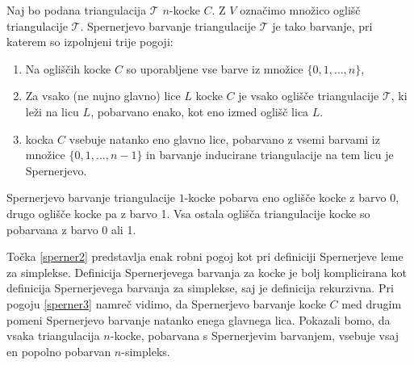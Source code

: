 \documentclass[mat1]{fmfdelo}
\newcommand{\0}{0}
\newcommand{\pT}{\mathcal T}
\begin{document}
\begin{definicija}\label{def:alo}
Naj bo podana triangulacija $\pT$ $n$-kocke $C$. Z $V$ označimo množico oglišč triangulacije $\pT$. Spernerjevo barvanje triangulacije $\pT$ je tako barvanje, pri katerem so izpolnjeni trije pogoji:
\begin{enumerate}
\item Na ogliščih kocke $C$ so uporabljene vse barve iz množice $\{0, 1, \dots, n \}$, \label{sperner1}
\item Za vsako (ne nujno glavno) lice $L$ kocke $C$ je vsako oglišče triangulacije $\pT$, ki leži na licu $L$, pobarvano enako, kot eno izmed oglišč lica $L$.\label{sperner2}
\item kocka $C$ vsebuje natanko eno glavno lice, pobarvano z vsemi barvami iz množice $\{0, 1, \dots, n-1\}$ in barvanje inducirane triangulacije na tem licu je Spernerjevo.\label{sperner3}
\end{enumerate}
Spernerjevo barvanje triangulacije $1$-kocke pobarva eno oglišče kocke z barvo 0, drugo oglišče kocke pa z barvo 1. Vsa ostala oglišča triangulacije kocke so pobarvana z barvo 0 ali 1.
\end{definicija}

Točka \eqref{sperner2} predstavlja enak robni pogoj kot pri definiciji Spernerjeve leme za simplekse.
Definicija Spernerjevega barvanja za kocke je bolj komplicirana kot definicija Spernerjevega barvanja za simplekse, saj je definicija \label{def:cubsperner} rekurzivna. Pri pogoju \eqref{sperner3} namreč vidimo, da Spernerjevo barvanje kocke $C$ med drugim pomeni Spernerjevo barvanje natanko enega glavnega lica.
Pokazali bomo, da vsaka triangulacija $n$-kocke, pobarvana s Spernerjevim barvanjem, vsebuje vsaj en popolno pobarvan $n$-simpleks.
\end{document}
